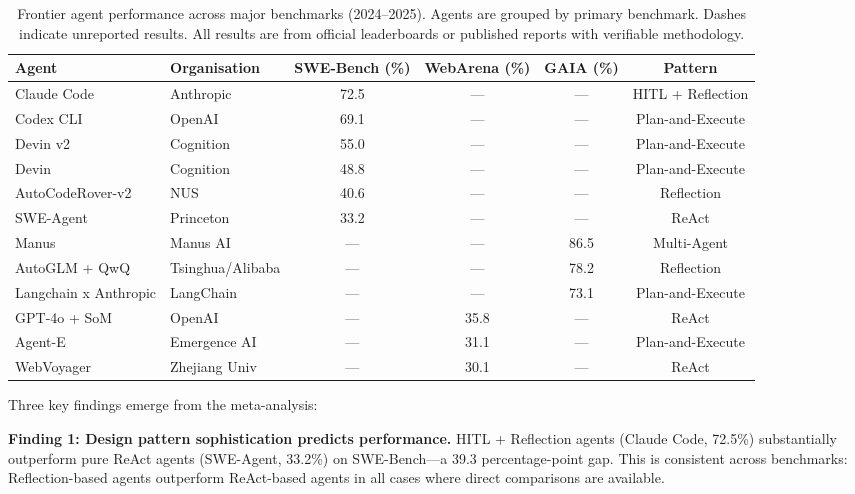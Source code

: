 \documentclass[review]{elsarticle}
\theoremstyle{definition}
\begin{document}
\FloatBarrier
\begin{table}[!htbp]
\centering\footnotesize
\caption{Frontier agent performance across major benchmarks (2024--2025). Agents are grouped by primary benchmark. Dashes indicate unreported results. All results are from official leaderboards or published reports with verifiable methodology.}
\label{tab:benchmarks}
\begin{tabular}{@{}llcccc@{}}
\toprule
\textbf{Agent} & \textbf{Organisation} & \textbf{SWE-Bench (\%)} & \textbf{WebArena (\%)} & \textbf{GAIA (\%)} & \textbf{Pattern} \\
\midrule
Claude Code         & Anthropic      & 72.5 & ---  & ---  & HITL + Reflection \\
Codex CLI           & OpenAI         & 69.1 & ---  & ---  & Plan-and-Execute \\
Devin v2            & Cognition      & 55.0 & ---  & ---  & Plan-and-Execute \\
Devin               & Cognition      & 48.8 & ---  & ---  & Plan-and-Execute \\
AutoCodeRover-v2    & NUS            & 40.6 & ---  & ---  & Reflection \\
SWE-Agent           & Princeton      & 33.2 & ---  & ---  & ReAct \\
Manus               & Manus AI       & ---  & ---  & 86.5 & Multi-Agent \\
AutoGLM + QwQ       & Tsinghua/Alibaba & --- & ---  & 78.2 & Reflection \\
Langchain x Anthropic & LangChain    & ---  & ---  & 73.1 & Plan-and-Execute \\
GPT-4o + SoM        & OpenAI         & ---  & 35.8 & ---  & ReAct \\
Agent-E             & Emergence AI   & ---  & 31.1 & ---  & Plan-and-Execute \\
WebVoyager          & Zhejiang Univ  & ---  & 30.1 & ---  & ReAct \\
\bottomrule
\end{tabular}
\end{table}

Three key findings emerge from the meta-analysis:

\textbf{Finding 1: Design pattern sophistication predicts performance.} HITL + Reflection agents (Claude Code, 72.5\%) substantially outperform pure ReAct agents (SWE-Agent, 33.2\%) on SWE-Bench---a 39.3 percentage-point gap. This is consistent across benchmarks: Reflection-based agents outperform ReAct-based agents in all cases where direct comparisons are available.
\end{document}
